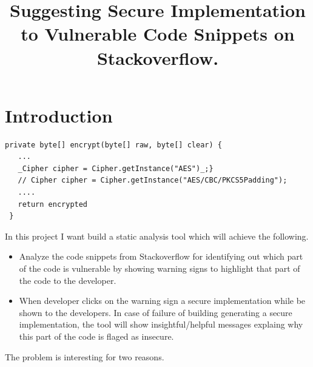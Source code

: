 \documentclass[sigconf]{acmart}
\newcommand{\note}[1]{\begin{noteBox} \textbf{Note:} #1 \end{noteBox}}
\begin{document}
\title{Suggesting Secure Implementation to Vulnerable Code Snippets on Stackoverflow.}
\begin{abstract}  
\end{abstract}
\maketitle
\section{Introduction}
\begin{lstlisting}[caption={A real code snippet taken from Stackoverflow. I want to build a tool which after analyzing the code snippet will highlight the part of the code that is insecure and suggest an alternative secure implementation as showed in the figure.}, label={fig:motivating-example}]
 private byte[] encrypt(byte[] raw, byte[] clear) {
   ...
   _Cipher cipher = Cipher.getInstance("AES")_;}
   // Cipher cipher = Cipher.getInstance("AES/CBC/PKCS5Padding");
   ....
   return encrypted
 }
  \end{lstlisting}
\label{into}
In this project I want build a static analysis tool which will achieve the following. 
\begin{itemize}
\item  Analyze the code snippets from Stackoverflow for identifying out which part of the code is vulnerable by showing warning signs to highlight that part of the code to the developer.
\item When developer clicks on the warning sign a secure implementation while be shown to the developers. In case of failure of building generating a secure implementation, the tool will show insightful/helpful messages explaing why this part of the code is flaged as insecure.  
\end{itemize}

The problem is interesting for two reasons. 
\end{document}
